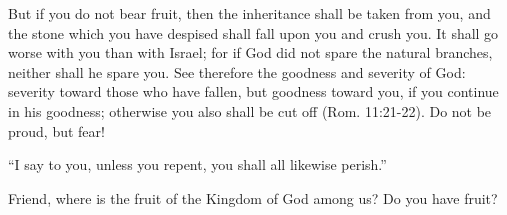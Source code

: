 But if you do not bear fruit, then the inheritance shall be taken from you, and the stone which you have despised shall fall upon you and crush you. It shall go worse with you than with Israel; for if God did not spare the natural branches, neither shall he spare you. See therefore the goodness and severity of God: severity toward those who have fallen, but goodness toward you, if you continue in his goodness; otherwise you also shall be cut off (Rom. 11:21-22). Do not be proud, but fear!

“I say to you, unless you repent, you shall all likewise perish.”

Friend, where is the fruit of the Kingdom of God among us? Do you have fruit?
